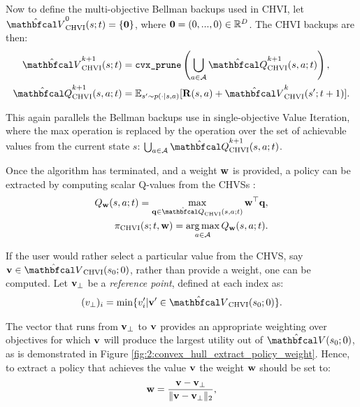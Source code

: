         Now to define the multi-objective Bellman backups used in CHVI, let $\Vchvi^0(s;t) = \{ \bff{0} \}$, where $\mathbf{0}=(0,...,0)\in\mathbb{R}^D$. The CHVI backups are then:
        \begin{align}
            \Vchvi^{k+1}(s;t) &= \cprune \left( \bigcup_{a\in\cl{A}} \Qchvi^{k+1}(s,a;t) \right), \label{eq:2:chvi_v_backup} \\
            \Qchvi^{k+1}(s,a;t) &= \bb{E}_{s'\sim p(\cdot|s,a)} [\bff{R}(s,a) + \Vchvi^k(s';t+1)]. \label{eq:2:chvi_q_backup}
        \end{align}
        
        This again parallels the Bellman backups use in single-objective Value Iteration, where the max operation is replaced by the \cprune\ewe operation over the set of achievable values from the current state $s$: $\bigcup_{a\in\cl{A}} \Qchvi^{k+1}(s,a;t)$.
        
        Once the algorithm has terminated, and a weight $\mathbf{w}$ is provided, a policy can be extracted by computing scalar Q-values from the CHVSs \cite{chvi}:
        \begin{align}
            Q_{\bff{w}}(s,a;t) = \max_{\bff{q}\in\Qchvi(s,a;t)} \bff{w}^\top \bff{q}, \label{eq:2:chvi_scalar_q_fn} \\
            \pichvi(s;t,\bff{w}) = \argmax_{a\in\cl{A}} Q_{\bff{w}}(s,a;t). \label{eq:2:chvi_policy}
        \end{align}

        If the user would rather select a particular value from the CHVS, say $\bff{v}\in\Vchvi(s_0;0)$, rather than provide a weight, one can be computed. Let $\mathbf{v}_\bot$ be a \textit{reference point}, defined at each index as:
        \begin{align}
            (v_{\bot})_i = \min \{v'_i | \bff{v}'\in\Vchvi(s_0;0) \}. \label{eq:2:chvi_ref_point}
        \end{align} 

        The vector that runs from $\mathbf{v}_\bot$ to $\mathbf{v}$ provides an appropriate weighting over objectives for which $\mathbf{v}$ will produce the largest utility out of $\hat{\bfcl{V}}(s_0;0)$, as is demonstrated in Figure \ref{fig:2:convex_hull_extract_policy_weight}. Hence, to extract a policy that achieves the value $\mathbf{v}$ the weight $\mathbf{w}$ should be set to:
        \begin{align}
            \mathbf{w} = \frac{\mathbf{v}-\mathbf{v}_\bot}{\Vert\mathbf{v}-\mathbf{v}_\bot\Vert_2}, \label{eq:2:chvi_extract_value_weight}
        \end{align}

